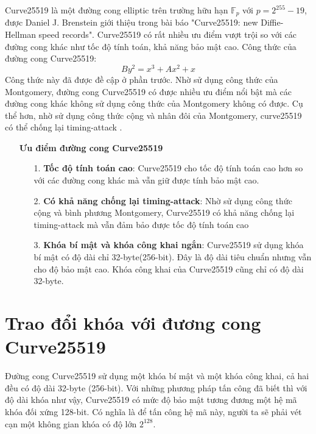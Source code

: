 \documentclass[a4paper,12pt]{report}
\begin{document}
Curve25519 là một đường cong elliptic trên trường hữu hạn $\mathbb{F}_p$ với $p = 2^{255} - 19$, được Daniel J. Brenstein giới thiệu trong bài báo "Curve25519: new Diffie-Hellman speed records". Curve25519 có rất nhiều ưu điểm vượt trội so với các đường cong khác như tốc độ tính toán,
khả năng bảo mật cao. Công thức của đường cong Curve25519:
\begin{displaymath}
By^2 = x^3 + Ax^2 + x
\end{displaymath}
Công thức này đã được đề cập ở phần trước. Nhờ sử dụng công thức của Montgomery, đường cong Curve25519 có được nhiều ưu điểm nổi bật mà các đường cong khác không sử dụng công thức của Montgomery không có được. Cụ thể hơn, nhờ sử dụng công thức cộng và nhân đôi của Montgomery, curve25519 có thể chống lại timing-attack .
\begin{itemize}
\item[] \textbf{Ưu điểm đường cong Curve25519}
\begin{itemize}
\item[1. ] \textbf{Tốc độ tính toán cao}: Curve25519 cho tốc độ tính toán cao hơn so với các đường cong khác mà vẫn giữ được tính bảo mật cao.
\item[2. ] \textbf{Có khả năng chống lại timing-attack}: Nhờ sử dụng công thức cộng và bình phương Montgomery, Curve25519 có khả năng chống lại timing-attack mà vẫn đảm bảo được tốc độ tính toán cao
\item[3. ] \textbf{Khóa bí mật và khóa công khai ngắn}: Curve25519 sử dụng khóa bí mật có độ dài chỉ 32-byte(256-bit). Đây là độ dài tiêu chuẩn nhưng vẫn cho độ bảo mật cao. Khóa công khai của Curve25519 cũng chỉ có độ dài 32-byte.
\end{itemize}
\end{itemize}
\section{Trao đổi khóa với đương cong Curve25519}
Đường cong Curve25519 sử dụng một khóa bí mật và một khóa công khai, cả hai đều có độ dài 32-byte (256-bit). Với những phương pháp tấn công đã biết thì với độ dài khóa như vậy, Curve25519 có mức độ bảo mật tương đương một hệ mã khóa đối xứng 128-bit. Có nghĩa là để tấn công hệ mã này, người ta sẽ phải vét cạn một không gian khóa có độ lớn $2^{128}$.
\end{document}
